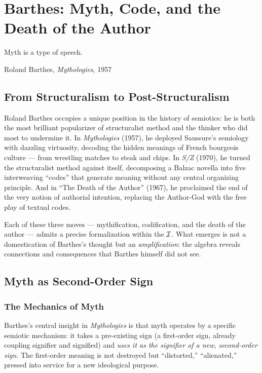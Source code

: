 \chapter{Barthes: Myth, Code, and the Death of the Author}
\label{ch:barthes}

\epigraph{Myth is a type of speech.}{Roland Barthes, \textit{Mythologies}, 1957}

\section{From Structuralism to Post-Structuralism}

Roland Barthes occupies a unique position in the history of semiotics:
he is both the most brilliant popularizer of structuralist method and
the thinker who did most to undermine it. In \textit{Mythologies}
(1957), he deployed Saussure's semiology with dazzling virtuosity,
decoding the hidden meanings of French bourgeois culture --- from
wrestling matches to steak and chips. In \textit{S/Z} (1970), he
turned the structuralist method against itself, decomposing a Balzac
novella into five interweaving ``codes'' that generate meaning without
any central organizing principle. And in ``The Death of the Author''
(1967), he proclaimed the end of the very notion of authorial intention,
replacing the Author-God with the free play of textual codes.

Each of these three moves --- mythification, codification, and the
death of the author --- admits a precise formalization within the
$\mathcal{I}$. What emerges is not a domestication of Barthes's thought but an
\emph{amplification}: the algebra reveals connections and consequences
that Barthes himself did not see.

\section{Myth as Second-Order Sign}

\subsection{The Mechanics of Myth}

Barthes's central insight in \textit{Mythologies} is that myth operates
by a specific semiotic mechanism: it takes a pre-existing sign (a
first-order sign, already coupling signifier and signified) and
\emph{uses it as the signifier of a new, second-order sign}. The
first-order meaning is not destroyed but ``distorted,'' ``alienated,''
pressed into service for a new ideological purpose.

